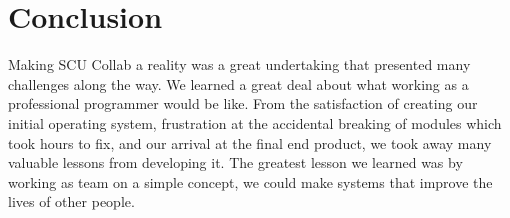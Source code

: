 \chapter{Conclusion}
Making SCU Collab a reality was a great undertaking that presented many challenges along the way. We learned a great deal about what working as a professional programmer would be like. From the satisfaction of creating our initial operating system, frustration at the accidental breaking of modules which took hours to fix, and our arrival at the final end product, we took away many valuable lessons from developing it. The greatest lesson we learned was by working as team on a simple concept, we could make systems that improve the lives of other people.
